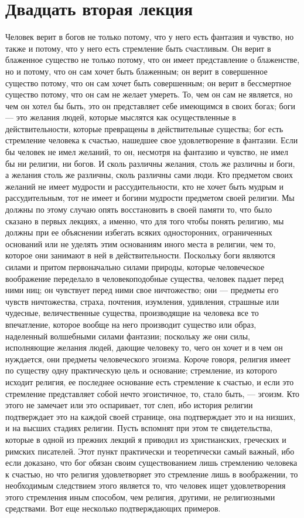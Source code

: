 \documentclass[12pt]{article}
\begin{document}
{}
\section*{Двадцать вторая лекция}

Человек верит в богов не только потому, что у него есть фантазия и чувство, но также и потому, что у него есть стремление быть счастливым. Он верит в блаженное существо не только потому, что он имеет представление о блаженстве, но и потому, что он сам хочет быть блаженным; он верит в совершенное существо потому, что он сам хочет быть совершенным; он верит в бессмертное существо потому, что он сам не желает умереть. То, чем он сам не является, но чем он хотел бы быть, это он представляет себе имеющимся в своих богах; боги --- это желания людей, которые мыслятся как осуществленные в действительности, которые превращены в действительные существа; бог есть стремление человека к счастью, нашедшее свое удовлетворение в фантазии. Если бы человек не имел желаний, то он, несмотря на фантазию и чувство, не имел бы ни религии, ни богов. И сколь различны желания, столь же различны и боги, а желания столь же различны, сколь различны сами люди. Кто предметом своих желаний не имеет мудрости и рассудительности, кто не хочет быть мудрым и рассудительным, тот не имеет и богини мудрости предметом своей религии. Мы должны по этому случаю опять восстановить в своей памяти то, что было сказано в первых лекциях, а именно, что для того чтобы понять религию, мы должны при ее объяснении избегать всяких односторонних, ограниченных оснований или не уделять этим основаниям иного места в религии, чем то, которое они занимают в ней в действительности. Поскольку боги являются силами и притом первоначально силами природы, которые человеческое воображение переделало в человекоподобные существа, человек падает перед ними ниц; он чувствует перед ними свое ничтожество; они --- предметы его чувств ничтожества, страха, почтения, изумления, удивления, страшные или чудесные, величественные существа, производящие на человека все то впечатление, которое вообще на него производит существо или образ, наделенный волшебными силами фантазии; поскольку же они силы, исполняющие желания людей, дающие человеку то, чего он хочет и в чем он нуждается, они предметы человеческого эгоизма. Короче говоря, религия имеет по существу одну практическую цель и основание; стремление, из которого исходит религия, ее последнее основание есть стремление к счастью, и если это стремление представляет собой нечто эгоистичное, то, стало быть, --- эгоизм. Кто этого не замечает или это оспаривает, тот слеп, ибо история религии подтверждает это на каждой своей странице, она подтверждает это и на низших, и на высших стадиях религии. Пусть вспомнят при этом те свидетельства, которые в одной из прежних лекций я приводил из христианских, греческих и римских писателей. Этот пункт практически и теоретически самый важный, ибо если доказано, что бог обязан своим существованием лишь стремлению человека к счастью, но что религия удовлетворяет это стремление лишь в воображении, то необходимым следствием этого является то, что человек ищет удовлетворения этого стремления иным способом, чем религия, другими, не религиозными средствами. Вот еще несколько подтверждающих примеров. 
\end{document}
